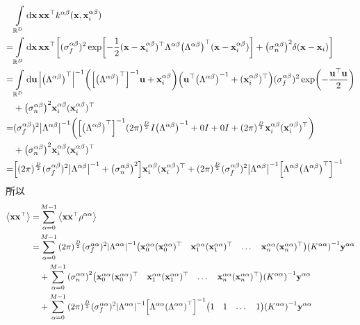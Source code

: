 \documentclass[12pt,UTF8]{article}
\begin{document}
            \begin{align}
                &\int\limits_{\mathbb{R}^D}{\dd{\vb{x}}\vb{x}\vb{x}^\top k^{\alpha\beta}(\vb{x},\vb{x}_i^{\alpha\beta})} \nonumber \\
                =&\int\limits_{\mathbb{R}^D}{\dd{\vb{x}}\vb{x}\vb{x}^\top\qty[(\sigma_f^{\alpha\beta})^2\exp[-\frac{1}{2}(\vb{x}-\vb{x}_i^{\alpha\beta})^\top\Lambda^{\alpha\beta}\qty(\Lambda^{\alpha\beta})^\top(\vb{x}-\vb{x}_i^{\alpha\beta})]+\qty(\sigma_n^{\alpha\beta})^2\delta(\vb{x}-\vb{x}_i)]} \\
                =&\int\limits_{\mathbb{R}^D}{\dd{\vb{u}}\abs{\qty(\Lambda^{\alpha\beta})^\top}^{-1}\qty(\qty[\qty(\Lambda^{\alpha\beta})^\top]^{-1}\vb{u}+\vb{x}_i^{\alpha\beta})\qty(\vb{u}^\top\qty(\Lambda^{\alpha\beta})^{-1}+(\vb{x}_i^{\alpha\beta})^\top)(\sigma_f^{\alpha\beta})^2\exp(-\frac{\vb{u}^\top\vb{u}}{2})} \nonumber \\
                &+\qty(\sigma_n^{\alpha\beta})^2\vb{x}_i^{\alpha\beta}(\vb{x}_i^{\alpha\beta})^\top \\
                =&(\sigma_f^{\alpha\beta})^2\abs{\Lambda^{\alpha\beta}}^{-1}\qty(\qty[\qty(\Lambda^{\alpha\beta})^\top]^{-1}(2\pi)^{\frac{D}{2}}I\qty(\Lambda^{\alpha\beta})^{-1}+0I+0I+(2\pi)^{\frac{D}{2}}\vb{x}_i^{\alpha\beta}(\vb{x}_i^{\alpha\beta})^\top) \nonumber \\
                &+\qty(\sigma_n^{\alpha\beta})^2\vb{x}_i^{\alpha\beta}(\vb{x}_i^{\alpha\beta})^\top \\
                =&\qty[(2\pi)^{\frac{D}{2}}(\sigma_f^{\alpha\beta})^2\abs{\Lambda^{\alpha\beta}}^{-1}+\qty(\sigma_n^{\alpha\beta})^2]\vb{x}_i^{\alpha\beta}(\vb{x}_i^{\alpha\beta})^\top+(2\pi)^{\frac{D}{2}}(\sigma_f^{\alpha\beta})^2\abs{\Lambda^{\alpha\beta}}^{-1}\qty[\Lambda^{\alpha\beta}\qty(\Lambda^{\alpha\beta})^\top]^{-1}
            \end{align}
            所以
            \begin{align}
                \ev{\vb{x}\vb{x}^\top}=&\sum_{\alpha=0}^{M-1}{\ev{\vb{x}\vb{x}^\top\rho^{\alpha\alpha}}} \\
                =&\sum_{\alpha=0}^{M-1}{(2\pi)^{\frac{D}{2}}(\sigma_f^{\alpha\alpha})^2\abs{\Lambda^{\alpha\alpha}}^{-1}\mqty(\vb{x}_0^{\alpha\alpha}(\vb{x}_0^{\alpha\alpha})^\top & \vb{x}_1^{\alpha\alpha}(\vb{x}_1^{\alpha\alpha})^\top & \dots & \vb{x}_n^{\alpha\alpha}(\vb{x}_n^{\alpha\alpha})^\top)\qty(K^{\alpha\alpha})^{-1}\vb{y}^{\alpha\alpha}} \nonumber \\
                &+\sum_{\alpha=0}^{M-1}{\qty(\sigma_n^{\alpha\alpha})^2\mqty(\vb{x}_0^{\alpha\alpha}(\vb{x}_0^{\alpha\alpha})^\top & \vb{x}_1^{\alpha\alpha}(\vb{x}_1^{\alpha\alpha})^\top & \dots & \vb{x}_n^{\alpha\alpha}(\vb{x}_n^{\alpha\alpha})^\top)\qty(K^{\alpha\alpha})^{-1}\vb{y}^{\alpha\alpha}} \nonumber \\
                &+\sum_{\alpha=0}^{M-1}{(2\pi)^{\frac{D}{2}}(\sigma_f^{\alpha\alpha})^2\abs{\Lambda^{\alpha\alpha}}^{-1}\qty[\Lambda^{\alpha\alpha}\qty(\Lambda^{\alpha\alpha})^\top]^{-1}\mqty(1 & 1 & \dots & 1)\qty(K^{\alpha\alpha})^{-1}\vb{y}^{\alpha\alpha}}
            \end{align}\par
\end{document}
